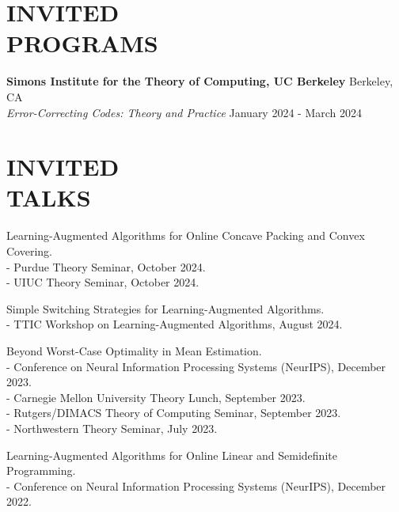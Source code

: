 \documentclass[margin, 10pt]{res} %
\begin{document}
\begin{resume}
\section{INVITED \\ PROGRAMS}

{\bf Simons Institute for the Theory of Computing, UC Berkeley} \hfill Berkeley, CA \\
\emph{Error-Correcting Codes: Theory and Practice} \hfill January 2024 - March 2024 

\section{INVITED \\ TALKS}

Learning-Augmented Algorithms for Online Concave Packing and Convex Covering.\\
\hphantom{12}- Purdue Theory Seminar, October 2024.\\
\hphantom{12}- UIUC Theory Seminar, October 2024.

Simple Switching Strategies for Learning-Augmented Algorithms.\\
\hphantom{12}- TTIC Workshop on Learning-Augmented Algorithms, August 2024.

Beyond Worst-Case Optimality in Mean Estimation.\\
\hphantom{12}- Conference on Neural Information Processing Systems (NeurIPS), December 2023.\\
\hphantom{12}- Carnegie Mellon University Theory Lunch, September 2023.\\
\hphantom{12}- Rutgers/DIMACS Theory of Computing Seminar, September 2023.\\
\hphantom{12}- Northwestern Theory Seminar, July 2023.

Learning-Augmented Algorithms for Online Linear and Semidefinite Programming.\\
\hphantom{12}- Conference on Neural Information Processing Systems (NeurIPS), December 2022.



\end{resume}
\end{document}
